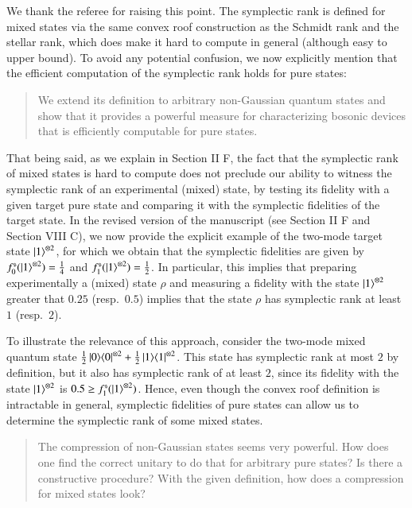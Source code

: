 \documentclass[a4paper,12pt]{article}
\newenvironment{Referee}[1]
{\noindent {\bf Comment #1:} \begin{quote} }
{\end{quote}\vspace{0 cm}}
\newenvironment{Response}
{\noindent \color{RawSienna}{\bf Response:} }
{\vspace{0.4 cm}}
\begin{document}
\begin{Response}
    We thank the referee for raising this point. The symplectic rank is defined for mixed states via the same convex roof construction as the Schmidt rank and the stellar rank, which does make it hard to compute in general (although easy to upper bound). 
To avoid any potential confusion, we now explicitly mention that the efficient computation of the symplectic rank holds for pure states:
\begin{quote}
    We extend its definition to arbitrary non-Gaussian quantum states and show that it provides a powerful measure for characterizing bosonic devices that is efficiently computable for pure states.
\end{quote}

That being said, as we explain in Section II F, the fact that the symplectic rank of mixed states is hard to compute does not preclude our ability to witness the symplectic rank of an experimental (mixed) state, by testing its fidelity with a given target pure state and comparing it with the symplectic fidelities of the target state. In the revised version of the manuscript (see Section II F and Section VIII C), we now provide the explicit example of the two-mode target state $\ket1^{\otimes2}$, for which we obtain that the symplectic fidelities are given by $f^{\mathfrak s}_0(\ket1^{\otimes2})=\frac14$ and $f^{\mathfrak s}_1(\ket1^{\otimes2})=\frac12$. In particular, this implies that preparing experimentally a (mixed) state $\rho$ and measuring a fidelity with the state $\ket1^{\otimes2}$ greater that $0.25$ (resp.\ $0.5$) implies that the state $\rho$ has symplectic rank at least $1$ (resp.\ $2$).

To illustrate the relevance of this approach, consider the two-mode mixed quantum state $\frac12\ket0\!\bra0^{\otimes2}+\frac12\ket1\!\bra1^{\otimes2}$. This state has symplectic rank at most $2$ by definition, but it also has symplectic rank of at least $2$, since its fidelity with the state $\ket1^{\otimes2}$ is $0.5\ge f^{\mathfrak s}_1(\ket1^{\otimes2})$. Hence, even though the convex roof definition is intractable in general, symplectic fidelities of pure states can allow us to determine the symplectic rank of some mixed states.
\end{Response}

\begin{Referee}{5}
The compression of non-Gaussian states seems very powerful. How does one find the correct unitary to do that for arbitrary pure states? Is there a constructive procedure? With the given definition, how does a compression for mixed states look?
\end{Referee}
\end{document}
